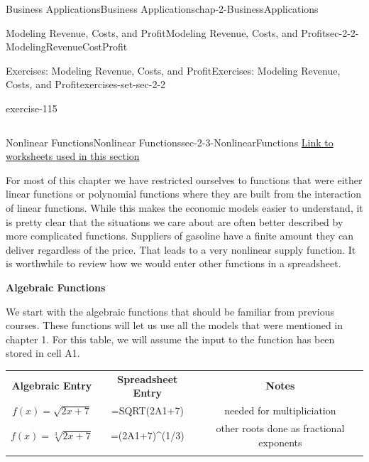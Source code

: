 \documentclass[oneside,10pt,]{book}
\newcommand{\terminology}[1]{\textbf{#1}}
\numberwithin{equation}{section}
\newcommand{\hrulethin}  {\noalign{\hrule height 0.04em}}
\newcommand{\hrulemedium}{\noalign{\hrule height 0.07em}}
\newcommand{\hrulethick} {\noalign{\hrule height 0.11em}}
\begin{document}
\begin{chapterptx}{Business Applications}{}{Business Applications}{}{}{chap-2-BusinessApplications}
\begin{sectionptx}{Modeling Revenue, Costs, and Profit}{}{Modeling Revenue, Costs, and Profit}{}{}{sec-2-2-ModelingRevenueCostProfit}
\begin{exercises-subsection-numberless}{Exercises: Modeling Revenue, Costs, and Profit}{}{Exercises: Modeling Revenue, Costs, and Profit}{}{}{exercises-set-sec-2-2}
\begin{exercisegroup}
\begin{divisionexerciseeg}{12}{}{}{exercise-115}
\begin{sidebyside}{1}{0}{0}{0}
\begin{sbspanel}{1}
{\begin{tabular}{ccccccccc}
\end{tabular}
\par}
\end{sbspanel}%
\end{sidebyside}%
\end{divisionexerciseeg}%
\end{exercisegroup}
\par\medskip\noindent
\end{exercises-subsection-numberless}
\end{sectionptx}
%
%
\typeout{************************************************}
\typeout{************************************************}
%
\begin{sectionptx}{Nonlinear Functions}{}{Nonlinear Functions}{}{}{sec-2-3-NonlinearFunctions}
\hypertarget{p-766}{}%
\href{./Examples/Section-2-3-Examples.xlsx}{Link to worksheets used in this section}%
\par
\hypertarget{p-767}{}%
For most of this chapter we have restricted ourselves to functions that were either linear functions or polynomial functions where they are built from the interaction of linear functions.  While this makes the economic models easier to understand, it is pretty clear that the situations we care about are often better described by more complicated functions.  Suppliers of gasoline have a finite amount they can deliver regardless of the price.  That leads to a very nonlinear supply function.  It is worthwhile to review how we would enter other functions in a spreadsheet.%
\par
\hypertarget{p-768}{}%
\terminology{Algebraic Functions}%
\par
\hypertarget{p-769}{}%
We start with the algebraic functions that should be familiar from previous courses.  These functions will let us use all the models that were mentioned in chapter 1.    For this table, we will assume the input to the function has been stored in cell A1.%
\begin{sidebyside}{1}{0}{0}{0}%
\begin{sbspanel}{1}%
{\centering%
\begin{tabular}{ccc}\hrulethick
\terminology{Algebraic Entry}&\terminology{Spreadsheet Entry}&\terminology{Notes}\tabularnewline\hrulethin
\(f(x)=\sqrt{2x+7}\)&=SQRT(2\textasteriskcentered{}A1+7)&\textasteriskcentered{} needed for multipliciation\tabularnewline\hrulemedium
\(f(x)=\sqrt[3]{2x+7}\)&=(2\textasteriskcentered{}A1+7)\textasciicircum{}(1\slash{}3)&other roots done as fractional exponents\tabularnewline\hrulemedium

\end{tabular}}
\end{sbspanel}
\end{sidebyside}
\end{sectionptx}
\end{chapterptx}
\end{document}
